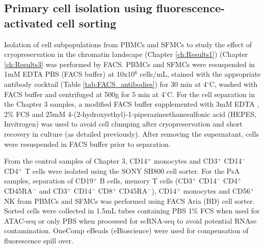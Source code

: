 \subsection{Primary cell isolation using fluorescence-activated cell sorting}
Isolation of cell subpopulations from PBMCs and SFMCs to study the effect of cryopreservation in the chromatin landscape (Chapter \ref{ch:Results1}) (Chapter \ref{ch:Results3} was performed by FACS. PBMCs and SFMCs were resuspended in 1mM EDTA PBS (FACS buffer) at 10x10$^6$ cells/mL, stained with the appropriate antibody cocktail (Table \ref{tab:FACS_antibodies}) for 30 min at 4{$^\circ$}C, washed with FACS buffer and centrifuged at 500g for 5 min at 4{$^\circ$}C. For the cell separation in the Chapter 3 samples, a modified FACS buffer supplemented with 3mM EDTA , 2\% FCS and 25mM 4-(2-hydroxyethyl)-1-piperazineethanesulfonic acid (HEPES, Invitrogen) was used to avoid cell clumping after cryopreservation and short recovery in culture (as detailed previously). After removing the supernatant, cells were resuspended in FACS buffer prior to separation. 

From the control samples of Chapter 3, CD14$^{+}$ monocytes and CD3$^+$ CD14$^{-}$ CD4$^{+}$ T cells were isolated using the SONY SH800 cell sorter. For the PsA samples, separation of CD19$^+$ B cells, memory T cells (CD3$^+$ CD14$^-$ CD4$^+$ CD45RA$^{-}$ and CD3$^+$ CD14$^-$ CD8$^+$ CD45RA$^-$), CD14$^+$ monocytes and CD56$^+$ NK from PBMCs and SFMCs was performed using FACS Aria (BD) cell sorter. Sorted cells were collected in 1.5mL tubes containing PBS 1\% FCS when used for ATAC-seq or only PBS when processed for scRNA-seq to avoid potential RNAse contamination. OneComp eBeads (eBioscience) were used for compensation of fluorescence spill over.



